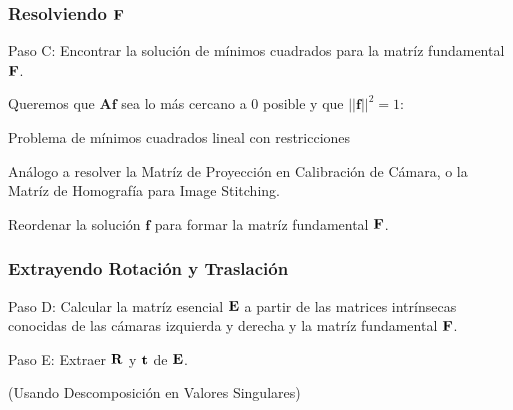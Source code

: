 \begin{frame}
    \frametitle{Resolviendo $\boldsymbol{\mathbf{F}}$}
    
    Paso C: Encontrar la solución de mínimos cuadrados para la matríz fundamental $\boldsymbol{\mathbf{F}}$.
    
    Queremos que $\mathbf{A f}$ sea lo más cercano a 0 posible y que $||\mathbf{f}||^2 = 1$:

    \begin{center}

        Problema de mínimos cuadrados lineal con restricciones
    \end{center}

    Análogo a resolver la Matríz de Proyección en Calibración de Cámara, o la Matríz de Homografía para Image Stitching.

    Reordenar la solución $\mathbf{f}$ para formar la matríz fundamental $\boldsymbol{\mathbf{F}}$.
    
\end{frame}

\begin{frame}
    \frametitle{Extrayendo Rotación y Traslación}
    
    Paso D: Calcular la matríz esencial $\boldsymbol{\mathbf{E}}$ a partir de las matrices intrínsecas conocidas de las cámaras izquierda y derecha y la matríz fundamental $\boldsymbol{\mathbf{F}}$.

    \begin{center}
    \end{center}

    Paso E: Extraer $\boldsymbol{\mathbf{R}}$ y $\boldsymbol{\mathbf{t}}$ de $\boldsymbol{\mathbf{E}}$.

    \begin{center}
        \fbox{$\essentialMatrix = \begin{bmatrix} \translation \end{bmatrix}_{\times} \rotation$}

        (Usando Descomposición en Valores Singulares)
    \end{center}

\end{frame}

